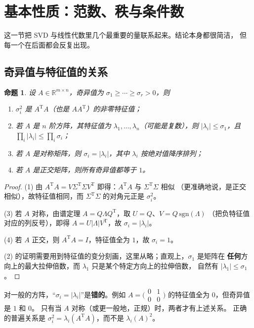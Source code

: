 \documentclass[UTF8, 11pt, a4paper, fontset=windows]{ctexart}
\theoremstyle{cnthm}
\newtheorem{prop}[thm]{命题}
\theoremstyle{cndef}
\newcommand{\T}{^{\mathrm{T}}}
\newcommand{\R}{\mathbb{R}}
\newcommand{\abs}[1]{\lvert #1 \rvert}
\begin{document}
\section{基本性质：范数、秩与条件数}\label{sec:prop}

这一节把 SVD 与线性代数里几个最重要的量联系起来。结论本身都很简洁，
但每一个在后面都会反复出现。

\subsection{奇异值与特征值的关系}

\begin{prop}\label{prop:sv-eig}
设 $A\in\R^{m\times n}$，奇异值为 $\sigma_1\ge\cdots\ge\sigma_r>0$，则
\begin{enumerate}
  \item $\sigma_i^2$ 是 $A\T A$（也是 $AA\T$）的非零特征值；
  \item 若 $A$ 是 $n$ 阶方阵，其特征值为 $\lambda_1,\dots,\lambda_n$（可能是复数），则
        $\abs{\lambda_i}\le\sigma_1$，且 $\prod_i\abs{\lambda_i}\le\prod_i\sigma_i$；
  \item 若 $A$ 是对称矩阵，则 $\sigma_i=\abs{\lambda_i}$，其中 $\lambda_i$ 按绝对值降序排列；
  \item 若 $A$ 是正交矩阵，则所有奇异值都等于 $1$。
\end{enumerate}
\end{prop}

\begin{proof}
(1) 由 $A\T A=V\Sigma\T\Sigma V\T$ 即得：$A\T A$ 与 $\Sigma\T\Sigma$ 相似
（更准确地说，是正交相似），故特征值相同，而 $\Sigma\T\Sigma$ 的对角元正是 $\sigma_i^2$。

(3) 若 $A$ 对称，由谱定理 $A=Q\Lambda Q\T$，取 $U=Q$、$V=Q\,\mathrm{sgn}(\Lambda)$
（把负特征值对应的列反号），即得 $A=U\abs{\Lambda}V\T$，故 $\sigma_i=\abs{\lambda_i}$。

(4) 若 $A$ 正交，则 $A\T A=I$，特征值全为 $1$，故 $\sigma_i=1$。

(2) 的证明需要用到特征值的变分刻画，这里从略；直观上，$\sigma_1$ 是矩阵在
\textbf{任何}方向上的最大拉伸倍数，而 $\lambda_1$ 只是某个特定方向上的拉伸倍数，
自然有 $\abs{\lambda_1}\le\sigma_1$。
\end{proof}

\begin{warnbox}[奇异值不是特征值的绝对值]
对一般的方阵，“$\sigma_i=\abs{\lambda_i}$”是\textbf{错的}。例如
$A=\bigl(\begin{smallmatrix}0&1\\0&0\end{smallmatrix}\bigr)$ 的特征值全为 $0$，但奇异值是 $1$ 和 $0$。
只有当 $A$ 对称（或更一般地，正规）时，两者才有上述关系。
正确的普遍关系是 $\sigma_i^2=\lambda_i(A\T A)$，而不是 $\lambda_i(A)^2$。
\end{warnbox}
\end{document}
